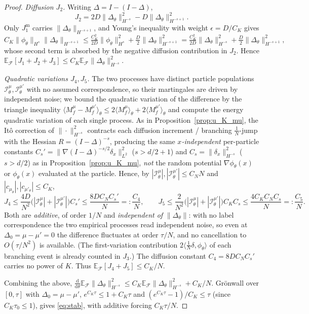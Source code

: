 \documentclass[a4paper,fleqn]{cas-sc}
\theoremstyle{definition}
\theoremstyle{remark}
\begin{document}
\begin{proof}
\emph{Diffusion $J_2$.} Writing $\Delta=I-(I-\Delta)$,
\[
J_2=2D\|\Delta_\theta\|_{H^{-s}}^2-D\|\Delta_\theta\|_{H^{-s+1}}^2.
\]
Only $J_1^{\mathrm m}$ carries $\|\Delta_\theta\|_{H^{-s+1}}$, and Young's
inequality with weight $\epsilon=D/C_K$ gives
\[
C_K\|\phi_\theta\|_{H^s}\|\Delta_\theta\|_{H^{-s+1}}
\le\tfrac{C_K^2}{2D}\|\phi_\theta\|_{H^s}^2+\tfrac{D}{2}\|\Delta_\theta\|_{H^{-s+1}}^2
=\tfrac{C_K^2}{2D}\|\Delta_\theta\|_{H^{-s}}^2+\tfrac{D}{2}\|\Delta_\theta\|_{H^{-s+1}}^2,
\]
whose second term is absorbed by the negative diffusion contribution in $J_2$.
Hence $\mathbb E_{\mathcal F}[J_1+J_2+J_3]\le C_K\mathbb E_{\mathcal F}\|\Delta_\theta\|_{H^{-s}}^2$.

\emph{Quadratic variations $J_4,J_5$.} The two processes have distinct particle
populations $\mathcal I^\mu_\theta,\mathcal I^{\mu'}_\theta$ with no assumed
correspondence, so their martingales are driven by independent noise; we
bound the quadratic variation of the difference by the triangle inequality
$\langle M^\mu_f-M^{\mu'}_f\rangle_\theta\le2\langle M^\mu_f\rangle_\theta+2\langle M^{\mu'}_f\rangle_\theta$
and compute the energy quadratic variation of each single process. As in
Proposition~\ref{prop:u_K_mu}, the It\^o correction of $\|\cdot\|_{H^{-s}}^2$
contracts each diffusion increment / branching $\tfrac1N$-jump with the Hessian
$R=(I-\Delta)^{-s}$, producing the same \emph{$x$-independent} per-particle
constants $C_s'=\|\nabla(I-\Delta)^{-s/2}\delta_x\|_{L^2}^2$ ($s>d/2+1$) and
$C_s=\|\delta_x\|_{H^{-s}}^2$ ($s>d/2$) as in Proposition~\ref{prop:u_K_mu},
\emph{not} the random potential $\nabla\phi_\theta(x)$ or $\phi_\theta(x)$ evaluated
at the particle. Hence, by $|\mathcal I^\mu_\theta|,|\mathcal I^{\mu'}_\theta|\le C_NN$
and $|c_{\mu_\theta}|,|c_{\mu'_\theta}|\le C_K$,
\[
J_4\le\frac{4D}{N^2}\bigl(|\mathcal I^\mu_\theta|+|\mathcal I^{\mu'}_\theta|\bigr)C_s'
\le\frac{8DC_NC_s'}{N}=:\frac{C_4}{N},
\qquad
J_5\le\frac{2}{N^2}\bigl(|\mathcal I^\mu_\theta|+|\mathcal I^{\mu'}_\theta|\bigr)C_KC_s
\le\frac{4C_KC_NC_s}{N}=:\frac{C_5}{N}.
\]
Both are \emph{additive}, of order $1/N$ and \emph{independent of}
$\|\Delta_\theta\|$: with no label correspondence the two empirical processes read
independent noise, so even at $\Delta_0=\mu-\mu'=0$ the difference fluctuates at
order $\tau/N$, and no cancellation to $O(\tau/N^2)$ is available. (The
first-variation contribution $2\langle\frac1N\delta,\phi_\theta\rangle$ of each
branching event is already counted in $J_3$.) The diffusion constant
$C_4=8DC_NC_s'$ carries no power of $K$. Thus
$\mathbb E_{\mathcal F}[J_4+J_5]\le C_K/N$.

Combining the above,
$\tfrac{\mathrm d}{\mathrm d\theta}\mathbb E_{\mathcal F}\|\Delta_\theta\|_{H^{-s}}^2
\le C_K\mathbb E_{\mathcal F}\|\Delta_\theta\|_{H^{-s}}^2+C_K/N$. Gr\"onwall over
$[0,\tau]$ with $\Delta_0=\mu-\mu'$, $e^{C_K\tau}\le1+C_K\tau$ and
$(e^{C_K\tau}-1)/C_K\le\tau$ (since $C_K\tau_0\le1$), gives \eqref{eq:stab}, with
additive forcing $C_K\tau/N$.
\end{proof}
\end{document}
